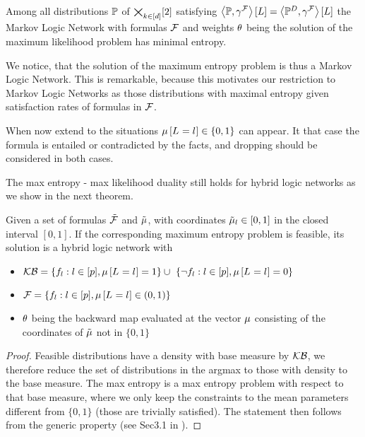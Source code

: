 \begin{corollary}
	Among all distributions $\mathbb{P}$ of $\bigtimes_{k\in[d]}[2]$ satisfying $\left\langle \mathbb{P},\gamma^{\mathcal{F}}\right\rangle \left[ L \right]
	 = \left\langle \mathbb{P}^{D},\gamma^{\mathcal{F}}\right\rangle \left[ L \right]$ the Markov Logic Network with formulas $\mathcal{F}$ and weights $\theta$ being the solution of the maximum likelihood problem has minimal entropy.
\end{corollary}

We notice, that the solution of the maximum entropy problem is thus a Markov Logic Network.
This is remarkable, because this motivates our restriction to Markov Logic Networks as those distributions with maximal entropy given satisfaction rates of formulas in $\mathcal{F}$.


When now extend to the situations $\mu\left[L_{}=l_{}\right]\in\{0,1\}$ can appear.
It that case the formula is entailed or contradicted by the facts, and dropping should be considered in both cases.

The max entropy - max likelihood duality still holds for hybrid logic networks as we show in the next theorem.

\begin{theorem}
	Given a set of formulas $\tilde{\mathcal{F}}$ and $\tilde{\mu}$, with coordinates $\tilde{\mu}_l\in[0,1]$ in the closed interval $[0,1]$.
	If the corresponding maximum entropy problem is feasible, its solution is a hybrid logic network with 
	\begin{itemize}
		\item $\hardformulaset= \{\enumformula : \selindexin, \meanparamat{\indexedselvariable} = 1\} \cup  \{\lnot\enumformula : \selindexin, \meanparamat{\indexedselvariable} = 0\} $
		\item $\mathcal{F} = \{f_{l} : l\in[p], \mu\left[L_{}=l_{}\right] \in (0,1)\}$
		\item $\theta$ being the backward map evaluated at the vector $\mu$ consisting of the coordinates of $\tilde{\mu}$ not in $\{0,1\}$
	\end{itemize}
\end{theorem}
\begin{proof}
	Feasible distributions have a density with base measure by $\mathcal{KB}$, we therefore reduce the set of distributions in the argmax to those with density to the base measure.
	The max entropy is a max entropy problem with respect to that base measure, where we only keep the constraints to the mean parameters different from $\{0,1\}$ (those are trivially satisfied).
	The statement then follows from the generic property (see Sec3.1 in \cite{wainwright_graphical_2008}).
\end{proof}






